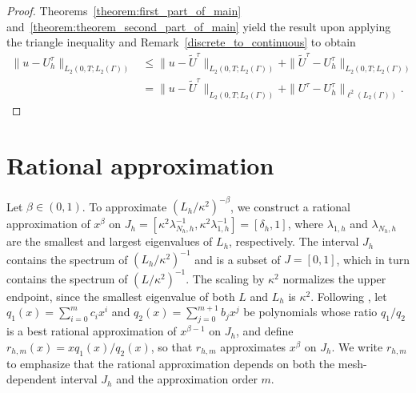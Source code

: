 \documentclass[numbers,webpdf]{ima-authoring-template}%
\theoremstyle{thmstyletwo}%
\numberwithin{equation}{section}
\begin{document}
\begin{proof}
Theorems~\ref{theorem:first_part_of_main} and~\ref{theorem:theorem_second_part_of_main} yield the result upon applying the triangle inequality and Remark~\ref{discrete_to_continuous} to obtain
\begin{align*}
        \|u-U_h^\tau\|_{L_2(0,T;L_2(\Gamma))} &\leq \|u-\tilde{U}^\tau\|_{L_2(0,T;L_2(\Gamma))} + \|\tilde{U}^\tau-U_h^\tau\|_{L_2(0,T;L_2(\Gamma))} \\
        &= \|u-\tilde{U}^\tau\|_{L_2(0,T;L_2(\Gamma))} + \|U^\tau-U_h^\tau\|_{\ell^2(L_2(\Gamma))}. 
\end{align*}
\hfill
\end{proof}


\section{Rational approximation}
\label{rationalapproximationsection}
Let $\beta\in(0,1)$. To approximate $(L_h/\kappa^2)^{-\beta}$, we construct a rational approximation of $x^\beta$ on $J_h=[\kappa^2\lambda_{N_h,h}^{-1},\kappa^2\lambda_{1,h}^{-1}]=[\delta_h,1]$, 
where $\lambda_{1,h}$ and $\lambda_{N_h,h}$ are the smallest and largest eigenvalues of $L_h$, respectively. The interval $J_h$ contains the spectrum of $(L_h/\kappa^2)^{-1}$ and is a subset of $J=[0,1]$, which in turn contains the spectrum of $(L/\kappa^2)^{-1}$. The scaling by $\kappa^2$ normalizes the upper endpoint, since the smallest eigenvalue of both $L$ and $L_h$ is $\kappa^2$. Following \cite{bolin2020rationalapprox}, let $q_1(x)=\sum_{i=0}^m c_i x^i$ and $q_2(x)=\sum_{j=0}^{m+1}b_jx^j$ be polynomials whose ratio $q_1/q_2$ is a best rational approximation of $x^{\beta-1}$ on $J_h$, and define $r_{h,m}(x) = x q_1(x)/q_2(x)$, so that $r_{h,m}$ approximates $x^\beta$ on $J_h$. We write $r_{h,m}$ to emphasize that the rational approximation depends on both the mesh-dependent interval $J_h$ and the approximation order $m$.
\end{document}
